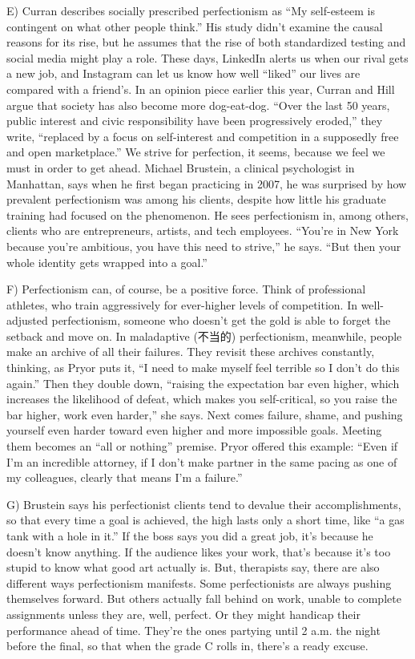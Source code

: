 \documentclass[UTF8,11pt]{ctexart}
\begin{document}
E) Curran describes socially prescribed perfectionism as “My self-esteem is contingent on what other people think.” His study didn’t examine the causal reasons for its rise, but he assumes that the rise of both standardized testing and social media might play a role. These days, LinkedIn alerts us when our rival gets a new job, and Instagram can let us know how well “liked” our lives are compared with a friend’s. In an opinion piece earlier this year, Curran and Hill argue that society has also become more dog-eat-dog. “Over the last 50 years, public interest and civic responsibility have been progressively eroded,” they write, “replaced by a focus on self-interest and competition in a supposedly free and open marketplace.” We strive for perfection, it seems, because we feel we must in order to get ahead. Michael Brustein, a clinical psychologist in Manhattan, says when he first began practicing in 2007, he was surprised by how prevalent perfectionism was among his clients, despite how little his graduate training had focused on the phenomenon. He sees perfectionism in, among others, clients who are entrepreneurs, artists, and tech employees. “You’re in New York because you’re ambitious, you have this need to strive,” he says. “But then your whole identity gets wrapped into a goal.”


F) Perfectionism can, of course, be a positive force. Think of professional athletes, who train aggressively for ever-higher levels of competition. In well-adjusted perfectionism, someone who doesn’t get the gold is able to forget the setback and move on. In maladaptive (不当的) perfectionism, meanwhile, people make an archive of all their failures. They revisit these archives constantly, thinking, as Pryor puts it, “I need to make myself feel terrible so I don’t do this again.” Then they double down, “raising the expectation bar even higher, which increases the likelihood of defeat, which makes you self-critical, so you raise the bar higher, work even harder,” she says. Next comes failure, shame, and pushing yourself even harder toward even higher and more impossible goals. Meeting them becomes an “all or nothing” premise. Pryor offered this example: “Even if I’m an incredible attorney, if I don’t make partner in the same pacing as one of my colleagues, clearly that means I’m a failure.”


G) Brustein says his perfectionist clients tend to devalue their accomplishments, so that every time a goal is achieved, the high lasts only a short time, like “a gas tank with a hole in it.” If the boss says you did a great job, it’s because he doesn’t know anything. If the audience likes your work, that’s because it’s too stupid to know what good art actually is. But, therapists say, there are also different ways perfectionism manifests. Some perfectionists are always pushing themselves forward. But others actually fall behind on work, unable to complete assignments unless they are, well, perfect. Or they might handicap their performance ahead of time. They’re the ones partying until 2 a.m. the night before the final, so that when the grade C rolls in, there’s a ready excuse.
\end{document}
